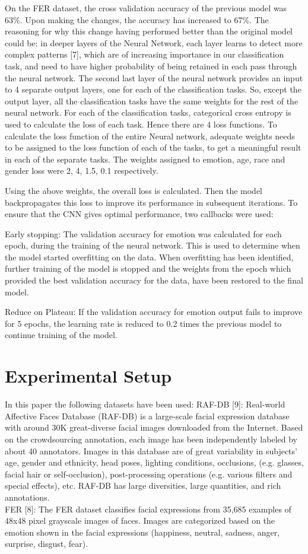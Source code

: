 \documentclass[letterpaper,10pt]{article}
\begin{document}
On the FER dataset, the cross validation accuracy of the previous model was 63\%.
Upon making the changes, the accuracy has increased to 67\%.
The reasoning for why this change having performed better than the original model could be: in deeper layers of the Neural Network, each layer learns to detect more complex patterns [7], which are of increasing importance in our classification task, and need to  have higher probability of being retained in each pass through the neural  network.
The second last layer of the neural network provides an input to 4 separate output layers, one for each of the classification tasks.
So, except the output layer, all the classification tasks have the same weights for the rest of the neural network.
For each of the classification tasks, categorical cross entropy is used to calculate the loss of each task. Hence there are  4 loss functions. To calculate the loss function of the entire Neural network, adequate weights needs to be assigned to the loss function of each of the tasks, to get a meaningful result in each of the separate tasks. The weights assigned to emotion, age, race and gender loss were 2, 4, 1.5, 0.1 respectively.

Using the above weights, the overall loss is calculated. Then the model backpropagates this loss to improve its performance in subsequent iterations.
To ensure that the CNN gives optimal performance, two callbacks were used:

Early stopping: The validation accuracy for emotion was calculated for each epoch, during the training of the neural network. This is used to determine when the model started overfitting on the data. When overfitting has been identified, further training of the model is stopped and the weights from the epoch which provided the best validation accuracy for the data, have been restored to the final model.

Reduce on Plateau: If the validation accuracy for emotion output fails to improve for 5 epochs, the learning rate is reduced to 0.2 times the previous model to continue training of the model.

\section{Experimental Setup}
In this paper the following datasets have been used:
RAF-DB [9]: Real-world Affective Faces Database (RAF-DB) is a large-scale facial expression database with around 30K great-diverse facial images downloaded from the Internet. Based on the crowdsourcing annotation, each image has been independently labeled by about 40 annotators. Images in this database are of great variability in subjects' age, gender and ethnicity, head poses, lighting conditions, occlusions, (e.g. glasses, facial hair or self-occlusion), post-processing operations (e.g. various filters and special effects), etc. RAF-DB has large diversities, large quantities, and rich annotations.\\
FER [8]: The FER dataset classifies facial expressions from 35,685 examples of 48x48 pixel grayscale images of faces. Images are categorized based on the emotion shown in the facial expressions (happiness, neutral, sadness, anger, surprise, disgust, fear).
\end{document}
